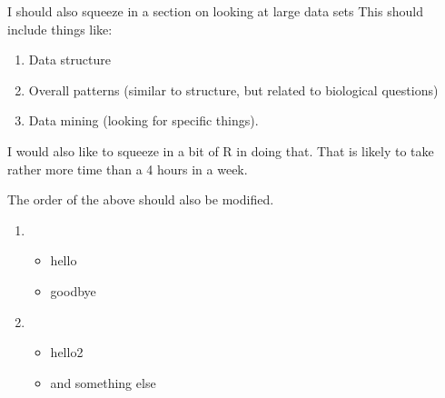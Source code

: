 \documentclass{article}
\begin{document}
I should also squeeze in a section on looking at large data sets This should include
things like:
\begin{enumerate}
\item Data structure
\item Overall patterns (similar to structure,  but related to biological questions)
\item Data mining (looking for specific things).
\end{enumerate}

I would also like to squeeze in a bit of R in doing that. That is likely to take
rather more time than a 4 hours in a week.

The order of the above should also be modified.

\begin{enumerate}
\item 
\begin{itemize}
\item hello
\item goodbye
\end{itemize}
\item 
\begin{itemize}
\item hello2
\item and something else
\end{itemize}
\end{enumerate}
\end{document}
